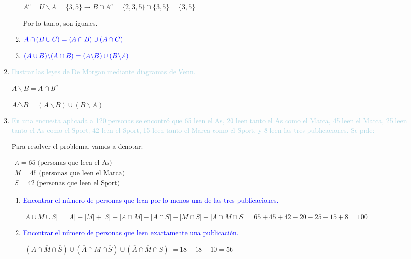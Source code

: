 \documentclass[12pt]{article}
\newcommand{\lb}[1]{\textcolor{lightblue}{#1}}
\newcommand{\db}[1]{\textcolor{blue}{#1}}
\begin{document}
\begin{enumerate}[label=\color{red}\textbf{\arabic*)},leftmargin=*]
\begin{enumerate}[label=\color{red}\alph*)]
      	$A^c=U\backslash A=\{3,5\}\longrightarrow B\cap A^c=\{2,3,5\}\cap\{3,5\}=\{3,5\}$
      	
      	Por lo tanto, son iguales.
      	\item $\db{A\cap(B\cup C)=(A\cap B)\cup(A\cap C)}$
      	\item $\db{(A\cup B)\backslash(A\cap B)=(A\backslash B)\cup(B\backslash A)}$
      \end{enumerate}
      \item \lb{Ilustrar las leyes de De Morgan mediante diagramas de Venn.}
      
      $A\backslash B=A\cap B^c$
      
      \begin{venndiagram2sets}[shade=lightblue!20]
      	\fillANotB
      \end{venndiagram2sets}
      
      $A\triangle B=(A\backslash B)\cup(B\backslash A)$
      
      \begin{venndiagram2sets}[shade=lightblue!20]
      	\fillANotB
      	\fillBNotA
      \end{venndiagram2sets}
      \item \lb{En una encuesta aplicada a 120 personas se encontró que 65 leen el As, 20 leen tanto el As como el Marca, 45 leen el Marca, 25 leen tanto el As como el Sport, 42 leen el Sport, 15 leen tanto el Marca como el Sport, y 8 leen las tres publicaciones. Se pide:}
      
      Para resolver el problema, vamos a denotar: 
      
      $\begin{array}{l}
      	A = 65 \text{ (personas que leen el As)}\\
      	M = 45 \text{ (personas que leen el Marca)}\\
      	S = 42 \text{ (personas que leen el Sport)}
      \end{array}$
      \begin{enumerate}[label=\color{red}\alph*)]
      	\item \db{Encontrar el número de personas que leen por lo menos una de las tres publicaciones.}

      	$|A\cup M\cup S|=|A|+|M|+|S|-|A\cap M|-|A\cap S|-|M\cap S|+|A\cap M\cap S|=65+45+42-20-25-15+8=100$
      	\item \db{Encontrar el número de personas que leen exactamente una publicación.}
      	
      	$\left|\left(A\cap\overline{M}\cap\overline{S}\right)\cup\left(\overline{A}\cap M\cap \overline{S}\right)\cup\left(\overline{A}\cap \overline{M}\cap S\right)\right|=18+18+10=56$
      	

\end{enumerate}
\end{enumerate}
\end{document}
